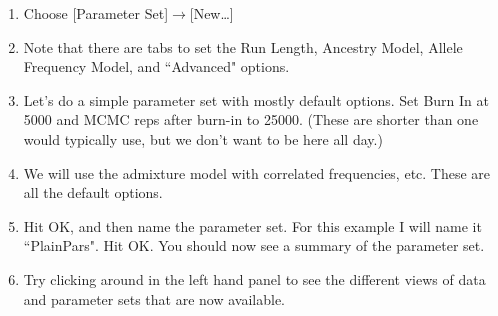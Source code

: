\begin{enumerate}
\item Choose [Parameter Set]$\rightarrow$[New\ldots]
\item Note that there are tabs to set the Run Length, Ancestry Model, Allele Frequency Model, and ``Advanced" options.
\item Let's do a simple parameter set with mostly default options.  Set Burn In at 5000 and MCMC reps after burn-in to 25000.  (These are shorter than one would typically use, but we don't want to be here all day.)
\item We will use the admixture model with correlated frequencies, etc.  These are all the default options.
\item Hit OK, and then name the parameter set.  For this example I will name it ``PlainPars".  Hit OK.  You should now see a summary of the parameter set.
\item Try clicking around in the left hand panel to see the different views of data and parameter sets that are now available.  
\end{enumerate}

